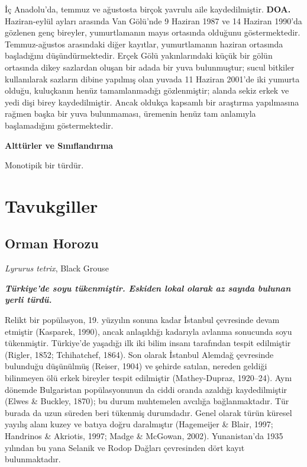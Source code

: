 \documentclass[
  a4paper,
  DIV=11,
  numbers=noendperiod]{scrreprt}
\begin{document}
İç Anadolu'da, temmuz ve ağustosta birçok yavrulu aile kaydedilmiştir.
\textbf{DOA.} Haziran-eylül ayları arasında Van Gölü'nde 9 Haziran 1987
ve 14 Haziran 1990'da gözlenen genç bireyler, yumurtlamanın mayıs
ortasında olduğunu göstermektedir. Temmuz-ağustos arasındaki diğer
kayıtlar, yumurtlamanın haziran ortasında başladığını düşündürmektedir.
Erçek Gölü yakınlarındaki küçük bir gölün ortasında dikey sazlardan
oluşan bir adada bir yuva bulunmuştur; sucul bitkiler kullanılarak
sazların dibine yapılmış olan yuvada 11 Haziran 2001'de iki yumurta
olduğu, kuluçkanın henüz tamamlanmadığı gözlenmiştir; alanda sekiz erkek
ve yedi dişi birey kaydedilmiştir. Ancak oldukça kapsamlı bir araştırma
yapılmasına rağmen başka bir yuva bulunmaması, üremenin henüz tam
anlamıyla başlamadığını göstermektedir.

\textbf{Alttürler ve Sınıflandırma}

Monotipik bir türdür.


\chapter{Tavukgiller}\label{tavukgiller}

\section{Orman Horozu}\label{orman-horozu}

\emph{Lyrurus tetrix}, Black Grouse

\textbf{\emph{Türkiye'de soyu tükenmiştir. Eskiden lokal olarak az
sayıda bulunan yerli türdü.}}

Relikt bir popülasyon, 19. yüzyılın sonuna kadar İstanbul çevresinde
devam etmiştir (Kasparek, 1990), ancak anlaşıldığı kadarıyla avlanma
sonucunda soyu tükenmiştir. Türkiye'de yaşadığı ilk iki bilim insanı
tarafından tespit edilmiştir (Rigler, 1852; Tchihatchef, 1864). Son
olarak İstanbul Alemdağ çevresinde bulunduğu düşünülmüş (Reiser, 1904)
ve şehirde satılan, nereden geldiği bilinmeyen ölü erkek bireyler tespit
edilmiştir (Mathey-Dupraz, 1920--24). Aynı dönemde Bulgaristan
popülasyonunun da ciddi oranda azaldığı kaydedilmiştir (Elwes \&
Buckley, 1870); bu durum muhtemelen avcılığa bağlanmaktadır. Tür burada
da uzun süreden beri tükenmiş durumdadır. Genel olarak türün küresel
yayılış alanı kuzey ve batıya doğru daralmıştır (Hagemeijer \& Blair,
1997; Handrinos \& Akriotis, 1997; Madge \& McGowan, 2002).
Yunanistan'da 1935 yılından bu yana Selanik ve Rodop Dağları çevresinden
dört kayıt bulunmaktadır.
\end{document}
